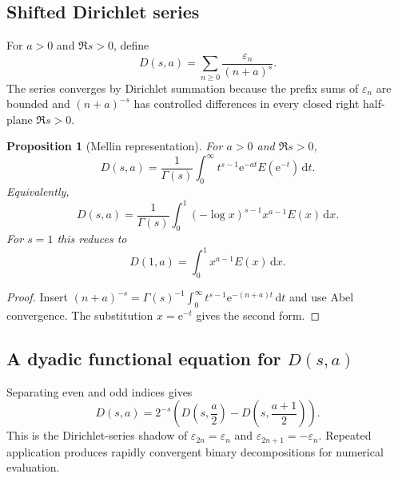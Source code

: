 \documentclass[11pt,oneside]{article}
\newtheorem{proposition}[theorem]{Proposition}
\theoremstyle{definition}
\theoremstyle{remark}
\newcommand{\e}{\mathrm e}
\newcommand{\dd}{\,\mathrm d}
\newcommand{\eps}{\varepsilon}
\begin{document}
\subsection{Shifted Dirichlet series}

For $a>0$ and $\Re s>0$, define
\begin{equation}\label{p3:eq:shifted-dirichlet}
 D(s,a)=\sum_{n\ge0}\frac{\eps_n}{(n+a)^s}.
\end{equation}
The series converges by Dirichlet summation because the prefix sums of
$\eps_n$ are bounded and $(n+a)^{-s}$ has controlled differences in every
closed right half-plane $\Re s>0$.

\begin{proposition}[Mellin representation]\label{p3:prop:mellin-dirichlet}
For $a>0$ and $\Re s>0$,
\begin{equation}\label{p3:eq:mellin-dirichlet}
 \boxed{\qquad
 D(s,a)=\frac1{\Gamma(s)}
 \int_0^\infty t^{s-1}\e^{-at}E(\e^{-t})\dd t.
 \qquad}
\end{equation}
Equivalently,
\begin{equation}\label{p3:eq:unit-interval-dirichlet}
 D(s,a)=\frac1{\Gamma(s)}
 \int_0^1(-\log x)^{s-1}x^{a-1}E(x)\dd x.
\end{equation}
For $s=1$ this reduces to
\begin{equation}\label{p3:eq:integral-D1}
 D(1,a)=\int_0^1x^{a-1}E(x)\dd x.
\end{equation}
\end{proposition}

\begin{proof}
Insert
$(n+a)^{-s}=\Gamma(s)^{-1}\int_0^\infty t^{s-1}\e^{-(n+a)t}\dd t$
and use Abel convergence.  The substitution $x=\e^{-t}$ gives the second
form.
\end{proof}

\subsection{A dyadic functional equation for \texorpdfstring{$D(s,a)$}{D(s,a)}}

Separating even and odd indices gives
\begin{equation}\label{p3:eq:dirichlet-functional}
 D(s,a)=2^{-s}
 \left(D\!\left(s,\frac a2\right)
       -D\!\left(s,\frac{a+1}{2}\right)\right).
\end{equation}
This is the Dirichlet-series shadow of $\eps_{2n}=\eps_n$ and
$\eps_{2n+1}=-\eps_n$.  Repeated application produces rapidly convergent
binary decompositions for numerical evaluation.
\end{document}
